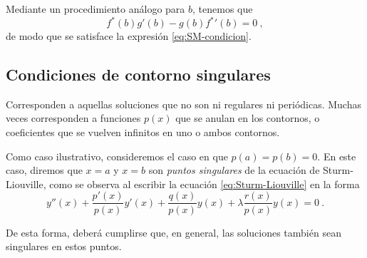 Mediante un procedimiento análogo para $b$, tenemos que
\begin{equation}
    f^\ast(b) g'(b) - g(b) {f^\ast}'(b) = 0 \ ,
\end{equation}
de modo que se satisface la expresión \eqref{eq:SM-condicion}.

\subsection{Condiciones de contorno singulares}

Corresponden a aquellas soluciones que no son ni regulares ni periódicas. Muchas veces corresponden a funciones $p(x)$ que se anulan en los contornos, o coeficientes que se vuelven infinitos en uno o ambos contornos.

Como caso ilustrativo, consideremos el caso en que $p(a) = p(b) = 0$. En este caso, diremos que $x=a$ y $x=b$ son \emph{puntos singulares} de la ecuación de Sturm-Liouville, como se observa al escribir la ecuación \eqref{eq:Sturm-Liouville} en la forma
\begin{equation}
    y''(x) + \frac{p'(x)}{p(x)} y'(x) + \frac{q(x)}{p(x)} y(x) + \lambda \frac{r(x)}{p(x)} y(x) = 0 \ .
\end{equation}

De esta forma, deberá cumplirse que, en general, las soluciones también sean singulares en estos puntos.